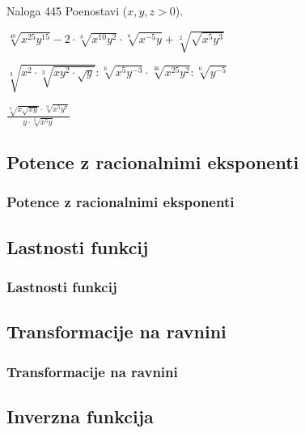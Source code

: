         \begin{frame}
            \begin{exampleblock}{Naloga 445}
                Poenostavi ($x,y,z>0$).
                \begin{description}
                    \item<2->[(g)] $\displaystyle \sqrt[40]{x^{25}y^{15}}-2\cdot\sqrt[8]{x^{10}y^2}\cdot\sqrt[8]{x^{-5}y}+\sqrt[2]{\sqrt{x^5y^3}}$
                    \item<3->[(m)] $\displaystyle \sqrt[3]{x^2\cdot\sqrt[3]{xy^2\cdot\sqrt{y}}}:\sqrt[6]{x^5y^{-3}}\cdot\sqrt[36]{x^{25}y^2}:\sqrt[6]{y^{-5}}$
                    \item<4->[(o)] $\displaystyle \frac{\sqrt[3]{x\sqrt{xy}}\cdot\sqrt[9]{x^5y^7}}{y\cdot\sqrt[6]{x^5y}}$  
                \end{description}
            \end{exampleblock}

        \end{frame}

    \subsection{Potence z racionalnimi eksponenti}

        \begin{frame}
            \frametitle{Potence z racionalnimi eksponenti}
        \end{frame}

    \subsection{Lastnosti funkcij}

        \begin{frame}
            \frametitle{Lastnosti funkcij}
        \end{frame}

    \subsection{Transformacije na ravnini}

        \begin{frame}
            \frametitle{Transformacije na ravnini}
        \end{frame}

    \subsection{Inverzna funkcija}

